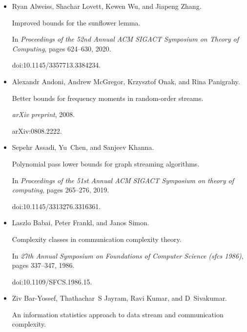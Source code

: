\begin{itemize}


\item[] 
[1]

Ryan Alweiss, Shachar Lovett, Kewen Wu, and Jiapeng Zhang.


Improved bounds for the sunflower lemma.


In \emph{Proceedings of the 52nd Annual ACM SIGACT Symposium on Theory
of Computing}, pages 624–630, 2020.


doi:10.1145/3357713.3384234.





\item[] 
[2]

Alexandr Andoni, Andrew McGregor, Krzysztof Onak, and Rina Panigrahy.


Better bounds for frequency moments in random-order streams.


\emph{arXiv preprint}, 2008.


arXiv:0808.2222.





\item[] 
[3]

Sepehr Assadi, Yu Chen, and Sanjeev Khanna.


Polynomial pass lower bounds for graph streaming algorithms.


In \emph{Proceedings of the 51st Annual ACM SIGACT Symposium on theory
of computing}, pages 265–276, 2019.


doi:10.1145/3313276.3316361.





\item[] 
[4]

Laszlo Babai, Peter Frankl, and Janos Simon.


Complexity classes in communication complexity theory.


In \emph{27th Annual Symposium on Foundations of Computer Science
(sfcs 1986)}, pages 337–347, 1986.


doi:10.1109/SFCS.1986.15.





\item[] 
[5]

Ziv Bar-Yossef, Thathachar S Jayram, Ravi Kumar, and D Sivakumar.


An information statistics approach to data stream and communication
complexity.



\end{itemize}
